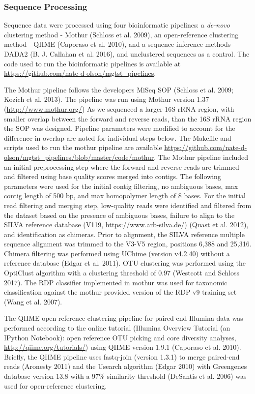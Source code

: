 \documentclass[smallextended]{svjour3}       %
\begin{document}
\hypertarget{sequence-processing}{%
\subsubsection{Sequence Processing}\label{sequence-processing}}

Sequence data were processed using four bioinformatic pipelines: a
\emph{de-novo} clustering method - Mothur (Schloss et al. 2009), an
open-reference clustering method - QIIME (Caporaso et al. 2010), and a
sequence inference methods - DADA2 (B. J. Callahan et al. 2016), and
unclustered sequences as a control. The code used to run the
bioinformatic pipelines is available at
\url{https://github.com/nate-d-olson/mgtst_pipelines}.

The Mothur pipeline follows the developers MiSeq SOP (Schloss et al.
2009; Kozich et al. 2013). The pipeline was run using Mothur version
1.37 (\url{http://www.mothur.org/}) As we sequenced a larger 16S rRNA
region, with smaller overlap between the forward and reverse reads, than
the 16S rRNA region the SOP was designed. Pipeline parameters were
modified to account for the difference in overlap are noted for
individual steps below. The Makefile and scripts used to run the mothur
pipeline are available
\url{https://github.com/nate-d-olson/mgtst_pipelines/blob/master/code/mothur}.
The Mothur pipeline included an initial preprocessing step where the
forward and reverse reads are trimmed and filtered using base quality
scores merged into contigs. The following parameters were used for the
initial contig filtering, no ambiguous bases, max contig length of 500
bp, and max homopolymer length of 8 bases. For the initial read
filtering and merging step, low-quality reads were identified and
filtered from the dataset based on the presence of ambiguous bases,
failure to align to the SILVA reference database (V119,
\url{https://www.arb-silva.de/}) (Quast et al. 2012), and identification
as chimeras. Prior to alignment, the SILVA reference multiple sequence
alignment was trimmed to the V3-V5 region, positions 6,388 and 25,316.
Chimera filtering was performed using UChime (version v4.2.40) without a
reference database (Edgar et al. 2011). OTU clustering was performed
using the OptiClust algorithm with a clustering threshold of 0.97
(Westcott and Schloss 2017). The RDP classifier implemented in mothur
was used for taxonomic classification against the mothur provided
version of the RDP v9 training set (Wang et al. 2007).

The QIIME open-reference clustering pipeline for paired-end Illumina
data was performed according to the online tutorial (Illumina Overview
Tutorial (an IPython Notebook): open reference OTU picking and core
diversity analyses, \url{http://qiime.org/tutorials/}) using QIIME
version 1.9.1 (Caporaso et al. 2010). Briefly, the QIIME pipeline uses
fastq-join (version 1.3.1) to merge paired-end reads (Aronesty 2011) and
the Usearch algorithm (Edgar 2010) with Greengenes database version 13.8
with a 97\% similarity threshold (DeSantis et al. 2006) was used for
open-reference clustering.
\end{document}
